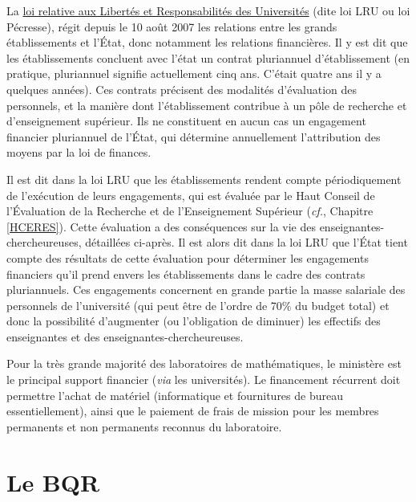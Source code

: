 La  \href{www.legifrance.gouv.fr/affichTexte.do?cidTexte=JORFTEXT000000824315}{loi relative aux Libert\'es et Responsabilit\'es des Universit\'es}
(dite loi LRU ou loi P\'ecresse), r\'egit depuis le 10 ao\^ut 2007 les relations 
entre les \og grands \'etablissements\fg{} et l'\'Etat, donc notamment les relations financi\`eres. Il y est dit que les \'etablissements 
concluent avec l'\'etat un \og  contrat pluriannuel d'\'etablissement\fg{} (en pratique, pluriannuel signifie actuellement cinq ans.
C'\'etait quatre ans il y a quelques ann\'ees). Ces contrats pr\'ecisent des modalit\'es d'\'evaluation des personnels, et la mani\`ere dont 
l'\'etablissement contribue \`a un \og p\^ole de recherche et d'enseignement sup\'erieur\fg{}. Ils ne constituent en aucun cas un engagement financier 
pluriannuel de l'\'Etat, qui d\'etermine annuellement l'attribution des moyens par la loi de finances.

Il est dit dans la loi LRU que les \'etablissements rendent compte p\'eriodiquement de l'ex\'ecution de leurs engagements, 
qui est \'evalu\'ee par le Haut Conseil de l'\'Evaluation de la Recherche et de l'Enseignement Sup\'erieur ({\em cf.}, Chapitre \ref{HCERES}). 
Cette évaluation a des cons\'equences sur la vie des enseignant\mp e\mp s-chercheur\mp euse\mp s, d\'etaill\'ees ci-apr\`es. Il est alors dit dans la loi LRU que 
l'\'Etat tient compte des r\'esultats de cette \'evaluation pour d\'eterminer 
les engagements financiers qu'il prend envers les \'etablissements dans le cadre des contrats pluriannuels.
Ces engagements concernent en grande partie la masse salariale des personnels de l'universit\'e 
(qui peut \^etre de l'ordre de 70\% du budget total) et donc la possibilit\'e d'augmenter (ou l'obligation de diminuer) 
les effectifs des enseignant\mp e\mp s et des enseignant\mp e\mp s-chercheur\mp euse\mp s.

Pour la tr\`es grande majorit\'e des laboratoires de math\'ematiques,
le minist\`ere est le principal support
financier (\emph{via} les universit\'es).
Le financement r\'ecurrent doit permettre l'achat de mat\'eriel
(informatique et fournitures de bureau essentiellement), ainsi que
le paiement de frais de mission pour les membres permanents et non
permanents reconnus du laboratoire.

\section{Le BQR}

